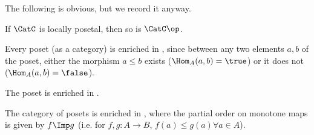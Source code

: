 %
The following is obvious, but we record it anyway.
\begin{lemma}
  \label{lem:loc_pos_op}
  If $\CatC$ is locally posetal, then so is $\CatC\op$.
\end{lemma}

\begin{example}
  \label{ex:enrichbool}Every poset (as a category) is enriched in \Bool, since between any two elements $a,b$ of the poset, either the morphism $a \leq b$ exists ($\Hom_A(a,b) = \true$) or it does not ($\Hom_A(a,b) = \false$).
\end{example}

\begin{example}
  The poset \Bool is enriched in \Bool.
\end{example}

\begin{example}
  The category \Pos of posets is enriched in \Pos, where the partial order on monotone maps is given by $f \Imp g$ (i.e. for $f,g : A \to B$, $f(a) \leq g(a) \forall a \in A$).
\end{example}

%

